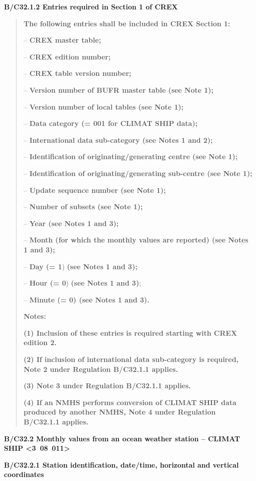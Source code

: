 \textbf{B/C32.1.2 Entries required in Section 1 of CREX}

\begin{quote}
\textbf{The following entries shall be included in CREX Section 1:}

-- \textbf{CREX master table;}

-- \textbf{CREX edition number;}

-- \textbf{CREX table version number;}

-- \textbf{Version number of BUFR master table (see Note 1);}

-- \textbf{Version number of local tables (see Note 1);}

-- \textbf{Data category (= 001 for CLIMAT SHIP data);}

-- \textbf{International data sub-category (see Notes 1 and 2);}

-- \textbf{Identification of originating/generating centre (see Note 1);}

-- \textbf{Identification of originating/generating sub-centre (see Note 1);}

-- \textbf{Update sequence number (see Note 1);}

-- \textbf{Number of subsets (see Note 1);}

-- \textbf{Year (see Notes 1 and 3);}

-- \textbf{Month (for which the monthly values are reported) (see Notes 1 and 3);}

-- \textbf{Day (= 1}) \textbf{(see Notes 1 and 3);}

-- \textbf{Hour (= 0}) \textbf{(see Notes 1 and 3)};

-- \textbf{Minute (= 0) (see Notes 1 and 3).}

\textbf{Notes:}

\textbf{(1) Inclusion of these entries is required starting with CREX edition 2.}

\textbf{(2) If inclusion of international data sub-category is required, Note 2 under Regulation B/C32.1.1 applies.}

\textbf{(3) Note 3 under Regulation B/C32.1.1 applies.}

\textbf{(4) If an NMHS performs conversion of CLIMAT SHIP data produced by another NMHS, Note 4 under Regulation B/C32.1.1 applies.}
\end{quote}

\textbf{B/C32.2 Monthly values from an ocean weather station -- CLIMAT SHIP \textless3~08~011\textgreater{}}

\textbf{B/C32.2.1 Station identification, date/time, horizontal and vertical coordinates}

